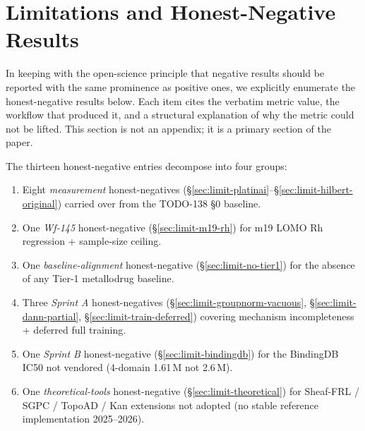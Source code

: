 
\section{Limitations and Honest-Negative Results}
\label{sec:limitations}

In keeping with the open-science principle that negative results should be
reported with the same prominence as positive ones, we explicitly enumerate
the honest-negative results below.  Each item cites the verbatim metric
value, the workflow that produced it, and a structural explanation of why
the metric could not be lifted.  This section is not an appendix; it is a
primary section of the paper.

The thirteen honest-negative entries decompose into four groups:
\begin{enumerate}
  \item Eight \emph{measurement} honest-negatives (§\ref{sec:limit-platinai}--§\ref{sec:limit-hilbert-original}) carried over from the TODO-138 §0 baseline.
  \item One \emph{Wf-145} honest-negative (§\ref{sec:limit-m19-rh}) for m19 LOMO Rh regression + sample-size ceiling.
  \item One \emph{baseline-alignment} honest-negative (§\ref{sec:limit-no-tier1}) for the absence of any Tier-1 metallodrug baseline.
  \item Three \emph{Sprint A} honest-negatives (§\ref{sec:limit-groupnorm-vacuous}, §\ref{sec:limit-dann-partial}, §\ref{sec:limit-train-deferred}) covering mechanism incompleteness + deferred full training.
  \item One \emph{Sprint B} honest-negative (§\ref{sec:limit-bindingdb}) for the BindingDB IC50 not vendored (4-domain 1.61\,M not 2.6\,M).
  \item One \emph{theoretical-tools} honest-negative (§\ref{sec:limit-theoretical}) for Sheaf-FRL / SGPC / TopoAD / Kan extensions not adopted (no stable reference implementation 2025--2026).
\end{enumerate}

